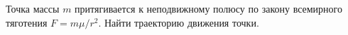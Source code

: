 Точка массы $m$ притягивается к неподвижному полюсу по закону всемирного тяготения $F=m\mu/r^2$.
Найти траекторию движения точки.
